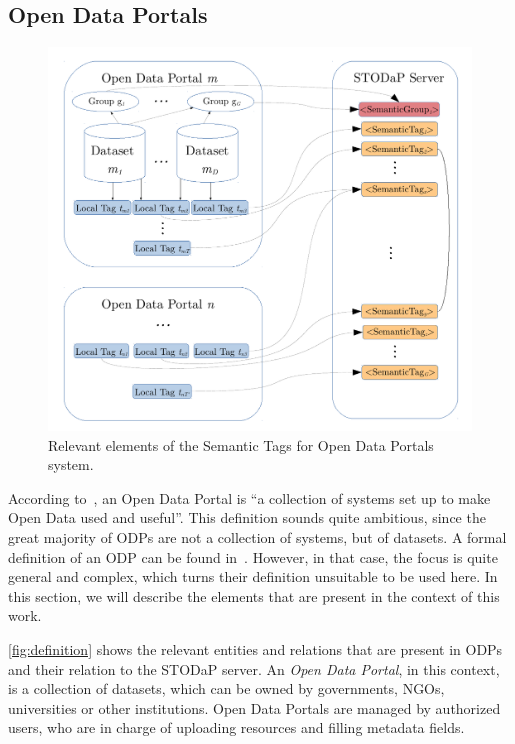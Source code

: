 \subsection{Open Data Portals}
\label{sec:definition} 

\begin{figure}[t]
\begin{center}
\includegraphics[width=\columnwidth]{images/odp_definition.pdf}
\caption{Relevant elements of the Semantic Tags for Open Data Portals system.}
\label{fig:definition}
\end{center}
\end{figure}

According to~, an Open Data Portal is ``a collection of systems set up to make Open Data used and useful''.
This definition sounds quite ambitious, since the great majority of ODPs are not a collection of systems, but of datasets.
A formal definition of an ODP can be found in~.
However, in that case, the focus is quite general and complex, which turns their definition unsuitable to be used here. 
In this section, we will describe the elements that are present in the context of this work.

\autoref{fig:definition} shows the relevant entities and relations that are present in ODPs and their relation to the STODaP server.
An \emph{Open Data Portal}, in this context, is a collection of datasets, which can be owned by governments, NGOs, universities or other institutions.
Open Data Portals are managed by authorized users, who are in charge of uploading resources and filling metadata fields.

